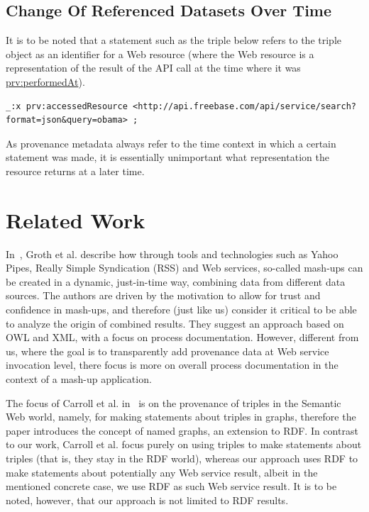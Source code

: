 \documentclass[conference]{IEEEtran}
\begin{document}
\subsection{Change Of Referenced Datasets Over Time}                        \label{sec:change}
It is to be noted that a statement such as the triple below refers to the triple object as an identifier for a Web resource (where the Web resource is a representation of the result of the API call at the time where it was \url{prv:performedAt}).
\begin{lstlisting}
_:x prv:accessedResource <http://api.freebase.com/api/service/search?format=json&query=obama> ;
\end{lstlisting}
As provenance metadata always refer to the time context in which a certain statement was made, it is essentially
unimportant what representation the resource returns at a later time.

\section{Related Work}\label{sec:related}
In~\cite{Groth:2009:MPD:1462159.1462162}, Groth et al. describe how through tools and technologies such as Yahoo Pipes, Really Simple Syndication (RSS) and Web services, so-called mash-ups can be created in a dynamic, just-in-time way, combining data from different data sources. The authors are driven by the motivation to allow for trust and confidence in mash-ups, and therefore (just like us) consider it critical to be able to analyze the origin of combined results. They suggest an approach based on OWL and XML, with a focus on process documentation. However, different from us, where the goal is to transparently add provenance data at Web service invocation level, there focus is more on overall process documentation in the context of a mash-up application.

The focus of Carroll et al. in~\cite{carroll2005} is on the provenance of triples in the Semantic Web world, namely, for making statements about triples in graphs, therefore the paper introduces the concept of named graphs, an extension to RDF. In contrast to our work, Carroll et al. focus purely on using triples to make statements about triples (that is, they stay in the RDF world), whereas our approach uses RDF to make statements about potentially any Web service result, albeit in the mentioned concrete case, we use RDF as such Web service result. It is to be noted, however, that our approach is not limited to RDF results.
\end{document}
